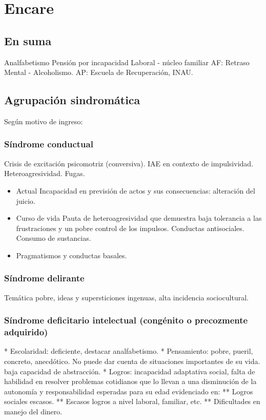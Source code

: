 \documentclass{scrbook}
\begin{document}
\section*{Encare}
\subsection*{En suma}
Analfabetismo Pensión por incapacidad Laboral - núcleo familiar AF: Retraso Mental - Alcoholismo. AP: Escuela de Recuperación, INAU.
\subsection*{Agrupación sindromática}
Según motivo de ingreso:
\subsubsection*{Síndrome conductual}
Crisis de excitación psicomotriz (conversiva). IAE en contexto de impulsividad. Heteroagresividad. Fugas.
\begin{itemize}
	\item Actual Incapacidad en previsión de actos y sus consecuencias: alteración del juicio.
	\item Curso de vida Pauta de heteroagresividad que demuestra baja tolerancia a las frustraciones y un pobre control de los impulsos. Conductas antisociales. Consumo de sustancias.
	\item Pragmatismos y conductas basales.
\end{itemize}
\subsubsection*{Síndrome delirante}
Temática pobre, ideas y supersticiones ingenuas, alta incidencia sociocultural.
\subsubsection{Síndrome deficitario intelectual (congénito o precozmente adquirido)}

* Escolaridad: deficiente, destacar analfabetismo.
* Pensamiento: pobre, pueril, concreto, anecdótico. No puede dar cuenta de situaciones importantes de su vida. baja capacidad de abstracción.
* Logros: incapacidad adaptativa social, falta de habilidad en resolver problemas cotidianos que lo llevan a una disminución de la autonomía y responsabilidad esperadas para su edad evidenciado en:
** Logros sociales escasos.
** Escasos logros a nivel laboral, familiar, etc.
** Dificultades en manejo del dinero.
\end{document}
